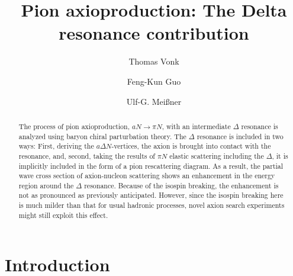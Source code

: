 \documentclass[reprint,amssymb,amsmath,floatfix,aps,prd,groupedaddress,nofootinbib]{revtex4-2}
\begin{document}
\title{Pion axioproduction:
The Delta resonance contribution}

\author{Thomas Vonk}
 
 \author{Feng-Kun Guo}

\author{Ulf-G. Mei{\ss}ner}


\begin{abstract}
The process of pion axioproduction, $aN\to\pi N$, with an intermediate $\Delta$ resonance is analyzed
using baryon chiral parturbation theory. The $\Delta$ resonance is included in two ways:
First, deriving the $a\Delta N$-vertices, the axion is brought into contact with the resonance, and,
second, taking the results of $\pi N$ elastic scattering including the $\Delta$, it is implicitly included in
the form of a pion rescattering diagram. As a result, the partial wave cross section of axion-nucleon
scattering shows an enhancement in the energy region around the $\Delta$ resonance. Because of the isospin breaking, the enhancement is not as pronounced as previously anticipated.
However, since the isospin breaking here is much milder than that for usual hadronic processes, novel axion search experiments might still exploit this effect.


\end{abstract}


\maketitle

\section{Introduction}
\end{document}
